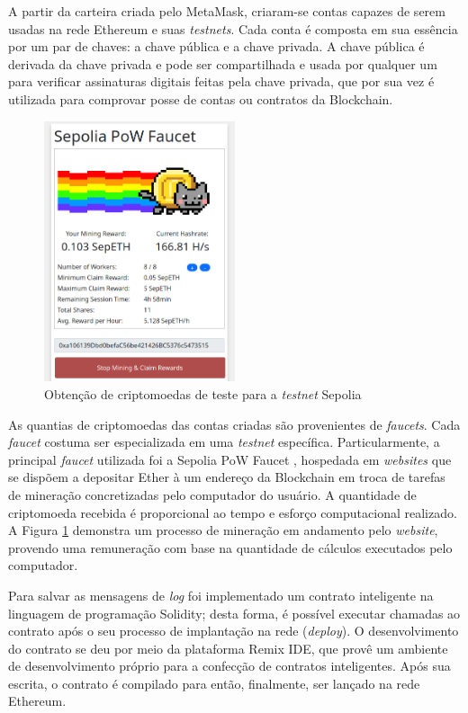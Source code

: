 A partir da carteira criada pelo MetaMask, criaram-se contas capazes de serem usadas na rede Ethereum e suas \emph{testnets}. Cada conta é composta em sua essência por um par de chaves: a chave pública e a chave privada. A chave pública é derivada da chave privada e pode ser compartilhada e usada por qualquer um para verificar assinaturas digitais feitas pela chave privada, que por sua vez é utilizada para comprovar posse de contas ou contratos da Blockchain. 

\begin{figure}
\centering
    \includegraphics[width=0.5\textwidth]{img/Cap3/blockchain/faucet.png}
    \caption{Obtenção de criptomoedas de teste para a \emph{testnet} Sepolia}
    \label{fig:faucet}
\end{figure}

As quantias de criptomoedas das contas criadas são provenientes de  \emph{faucets}. Cada \emph{faucet} costuma ser especializada em uma \emph{testnet} específica. Particularmente, a principal \emph{faucet} utilizada foi a Sepolia PoW Faucet \cite{pow_faucet}, hospedada em \emph{websites} que se dispõem a depositar Ether à um endereço da Blockchain em troca de tarefas de mineração concretizadas pelo computador do usuário. A quantidade de criptomoeda recebida é proporcional ao tempo e esforço computacional realizado. A Figura \ref{fig:faucet} demonstra um processo de mineração em andamento pelo \emph{website}, provendo uma remuneração com base na quantidade de cálculos executados pelo computador.

Para salvar as mensagens de \emph{log} foi implementado um contrato inteligente na linguagem de programação Solidity; desta forma, é possível executar chamadas ao contrato após o seu processo de implantação na rede (\emph{deploy}). O desenvolvimento do contrato se deu por meio da plataforma Remix IDE, que provê um ambiente de desenvolvimento próprio para a confecção de contratos inteligentes. Após sua escrita, o contrato é compilado para então, finalmente, ser lançado na rede Ethereum. 

